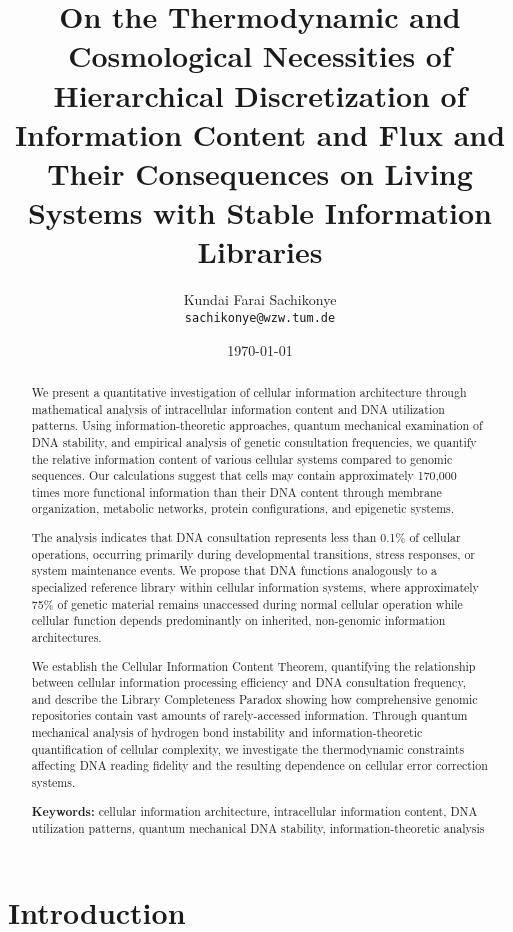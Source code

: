 \documentclass[12pt,a4paper]{article}
\title{On the Thermodynamic and Cosmological Necessities of Hierarchical Discretization of Information Content and Flux and Their Consequences on Living Systems with Stable Information Libraries}
\author{Kundai Farai Sachikonye\\
\texttt{sachikonye@wzw.tum.de}}
\date{\today}
\begin{document}
\maketitle

\begin{abstract}
We present a quantitative investigation of cellular information architecture through mathematical analysis of intracellular information content and DNA utilization patterns. Using information-theoretic approaches, quantum mechanical examination of DNA stability, and empirical analysis of genetic consultation frequencies, we quantify the relative information content of various cellular systems compared to genomic sequences. Our calculations suggest that cells may contain approximately 170,000 times more functional information than their DNA content through membrane organization, metabolic networks, protein configurations, and epigenetic systems.

The analysis indicates that DNA consultation represents less than 0.1\% of cellular operations, occurring primarily during developmental transitions, stress responses, or system maintenance events. We propose that DNA functions analogously to a specialized reference library within cellular information systems, where approximately 75\% of genetic material remains unaccessed during normal cellular operation while cellular function depends predominantly on inherited, non-genomic information architectures.

We establish the Cellular Information Content Theorem, quantifying the relationship between cellular information processing efficiency and DNA consultation frequency, and describe the Library Completeness Paradox showing how comprehensive genomic repositories contain vast amounts of rarely-accessed information. Through quantum mechanical analysis of hydrogen bond instability and information-theoretic quantification of cellular complexity, we investigate the thermodynamic constraints affecting DNA reading fidelity and the resulting dependence on cellular error correction systems.

\textbf{Keywords:} cellular information architecture, intracellular information content, DNA utilization patterns, quantum mechanical DNA stability, information-theoretic analysis
\end{abstract}

\section{Introduction}
\end{document}
